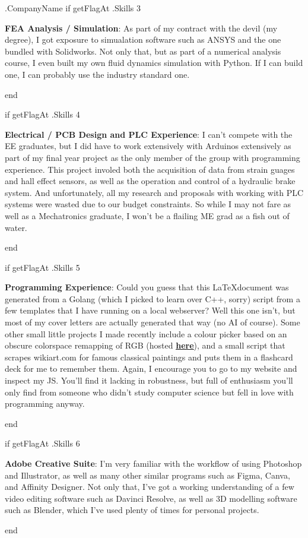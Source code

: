 \documentclass[10pt]{letter}
\begin{document}
\begin{letter}{
    {{ .CompanyName }}
}
{{ if getFlagAt .Skills 3 }}
\begin{minipage}{\linewidth}
\textbf{FEA Analysis / Simulation}: As part of my contract with the devil (my degree), I got exposure to simualation software such as  ANSYS and the one bundled with Solidworks. Not only that, but as part of a numerical analysis course, I even built my own fluid dynamics simulation with Python. If I can build one, I can probably use the industry standard one. 
\end{minipage}
{{ end }}

{{ if getFlagAt .Skills 4 }}
\begin{minipage}{\linewidth}
\textbf{Electrical / PCB Design and PLC Experience}: I can't compete with the EE graduates, but I did have to work extensively with Arduinos extensively as part of my final year project as the only member of the group with programming experience. This project involed both the acquisition of data from strain guages and hall effect sensors, as well as the operation and control of a hydraulic brake system. And unfortunately, all my research and proposals with working with PLC systems were wasted due to our budget constraints. So while I may not fare as well as a Mechatronics graduate, I won't be a flailing ME grad as a fish out of water. 
\end{minipage}
{{ end }}

{{ if getFlagAt .Skills 5 }}
\begin{minipage}{\linewidth}
\textbf{Programming Experience}: Could you guess that this \LaTeX document was generated from a Golang (which I picked to learn over C++, sorry) script from a few templates that I have running on a local webserver? Well this one isn't, but most of my cover letters are actually generated that way (no AI of course). Some other small little projects I made recently include a colour picker based on an obscure colorspace remapping of RGB (hosted \underline{\textbf{\href{https://zabuzabuzazaa.xyz/home/ok_palette/}{here}}}), and a small script that scrapes wikiart.com for famous classical paintings and puts them in a flashcard deck for me to remember them. Again, I encourage you to go to my website and inspect my JS. You'll find it lacking in robustness, but full of enthusiasm you'll only find from someone who didn't study computer science but fell in love with programming anyway. 
\end{minipage}
{{ end }}

{{ if getFlagAt .Skills 6 }}
\begin{minipage}{\linewidth}
\textbf{Adobe Creative Suite}: I'm very familiar with the workflow of using Photoshop and Illustrator, as well as many other similar programs such as Figma, Canva, and Affinity Designer. Not only that, I've got a working understanding of a few video editing software such as Davinci Resolve, as well as 3D modelling software such as Blender, which I've used plenty of times for personal projects. 
\end{minipage}
{{ end }}


\end{letter}
\end{document}
